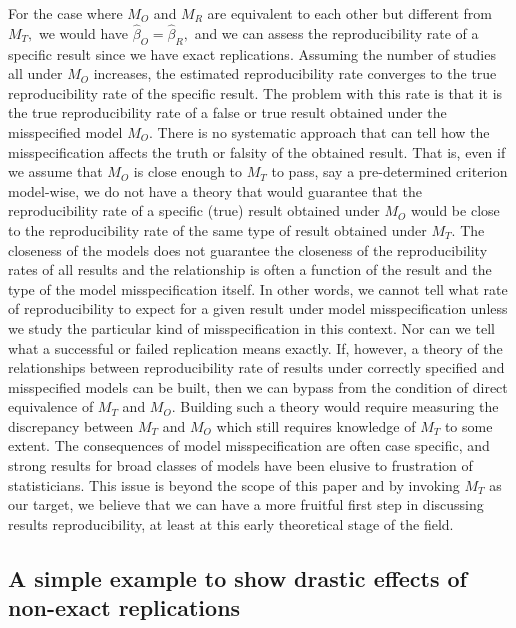 \documentclass[meta,authordate]{jote-new-article}
\newcounter{result}
\begin{document}
For the case where $M_O$ and $M_R$ are equivalent to each other but different from $M_T,$ we would have $\hat{\beta}_{O}=\hat{\beta}_{R},$ and we can assess the reproducibility rate of a specific result since we have exact replications. Assuming the number of studies all under $M_O$ increases, the estimated reproducibility rate converges to the true reproducibility rate of the specific result. The problem with this rate is that it is the true reproducibility rate of a false or true result obtained under the misspecified model $M_O.$ There is no systematic approach that can tell how the misspecification affects the truth or falsity of the obtained result. That is, even if we assume that $M_O$ is close enough to $M_T$ to pass, say a pre-determined criterion model-wise, we do not have a theory that would guarantee that the reproducibility rate of a specific (true) result obtained under $M_O$ would be close to the reproducibility rate of the same type of result obtained under $M_T.$ The closeness of the models does not guarantee the closeness of the reproducibility rates of all results and the relationship is often a function of the result and the type of the model misspecification itself. In other words, we cannot tell what rate of reproducibility to expect for a given result under model misspecification unless we study the particular kind of misspecification in this context. Nor can we tell what a successful or failed replication means exactly. If, however, a theory of the relationships between reproducibility rate of results under correctly specified and misspecified models can be built, then we can bypass from the condition of direct equivalence of $M_T$ and $M_O.$ Building such a theory would require measuring the discrepancy between $M_T$ and $M_O$ which still requires knowledge of $M_T$ to some extent. The consequences of model misspecification are often case specific, and strong results for broad classes of models have been elusive to frustration of statisticians. This issue is beyond the scope of this paper and by invoking $M_T$ as our target, we believe that we can have a more fruitful first step in discussing results reproducibility, at least at this early theoretical stage of the field.



\newpage
\subsection{A simple example to show drastic effects of non-exact replications}
\end{document}
